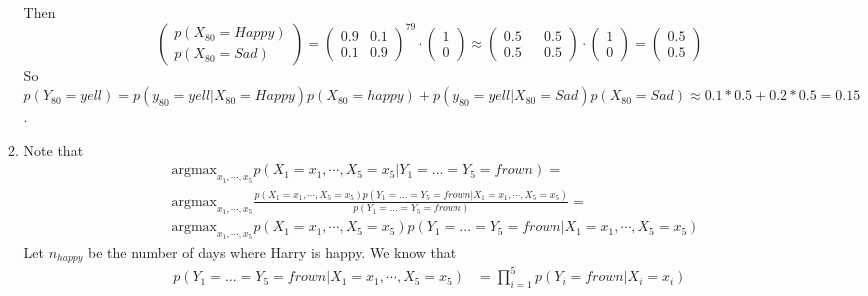\begin{enumerate}
\begin{enumerate}
        Then \[
        \begin{pmatrix}
            p(X_{80} = Happy) \\
            p(X_{80} = Sad)
        \end{pmatrix}
        =
        \begin{pmatrix}
            0.9 & 0.1 \\
            0.1 & 0.9 
        \end{pmatrix}^{79}
        \cdot
        \begin{pmatrix}
            1 \\
            0
        \end{pmatrix}
        \approx
        \begin{pmatrix}
            0.5 && 0.5 \\
            0.5 && 0.5
        \end{pmatrix} 
        \cdot
        \begin{pmatrix}
            1 \\
            0
        \end{pmatrix}
        =
        \begin{pmatrix}
            0.5 \\
            0.5
        \end{pmatrix}
        \] So
    \(p(Y_{80}=yell) = p(y_{80}=yell|X_{80}=Happy)p(X_{80}=happy) + p(y_{80}=yell|X_{80}=Sad)p(X_{80}=Sad)\approx0.1*0.5 + 0.2 * 0.5 = 0.15\).
  \item
    Note that
    \begin{equation}
        \begin{split}
            & \mbox{argmax}_{x_1,\cdots,x_5} p(X_1=x_1,\cdots,X_5=x_5|Y_1=...=Y_5=frown) = \\
            & \mbox{argmax}_{x_1,\cdots,x_5} \frac
                {
                    p(X_1=x_1,\cdots,X_5=x_5)p(Y_1=...=Y_5=frown|X_1=x_1,\cdots,X_5=x_5)
                }
                {
                    p(Y_1=...=Y_5=frown)
                } = \\
            & \mbox{argmax}_{x_1,\cdots,x_5} p(X_1=x_1,\cdots,X_5=x_5)p(Y_1=...=Y_5=frown|X_1=x_1,\cdots,X_5=x_5)
        \end{split}
    \end{equation}
    Let $n_{happy}$ be the number of days where Harry is happy. We know that 
    \begin{equation}
        \begin{split}
        p(Y_1=...=Y_5=frown|X_1=x_1,\cdots,X_5=x_5) & = \prod_{i=1}^5 p(Y_i=frown | X_i=x_i) \\

\end{split}
\end{equation}
\end{enumerate}
\end{enumerate}

